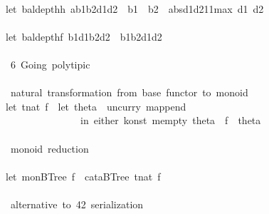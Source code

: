 \documentclass[a4paper]{article}
\begin{document}
\begin{tabbing}
\ttfamily ~\\
\ttfamily ~let~baldepthh~ab1b2d1d2~~b1~~b2~~absd1d211max~d1~d2~\\
\ttfamily ~\\
\ttfamily ~let~baldepthf~b1d1b2d2~~b1b2d1d2\\
\ttfamily ~\\
\ttfamily ~~6~Going~polytipic~\\
\ttfamily ~\\
\ttfamily ~~natural~transformation~from~base~functor~to~monoid\\
\ttfamily ~let~tnat~f~~let~theta~~uncurry~mappend\\
\ttfamily ~~~~~~~~~~~~~~~~in~either~konst~mempty~theta~~f~~theta\\
\ttfamily ~\\
\ttfamily ~~monoid~reduction~\\
\ttfamily ~\\
\ttfamily ~let~monBTree~f~~cataBTree~tnat~f\\
\ttfamily ~\\
\ttfamily ~~alternative~to~42~serialization~\\

\end{tabbing}
\end{document}
